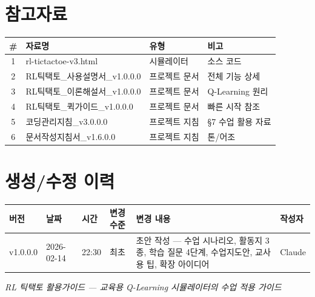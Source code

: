 \documentclass[11pt,a4paper]{article}
\begin{document}
\newpage
\section*{참고자료}

\begin{center}
\renewcommand{\arraystretch}{1.4}
\begin{tabular}{|c|l|l|l|}
\hline
\rowcolor{tableheader}
\textbf{\#} & \textbf{자료명} & \textbf{유형} & \textbf{비고} \\
\hline
1 & rl-tictactoe-v3.html & 시뮬레이터 & 소스 코드 \\
\hline
2 & RL틱택토\_사용설명서\_v1.0.0.0 & 프로젝트 문서 & 전체 기능 상세 \\
\hline
3 & RL틱택토\_이론해설서\_v1.0.0.0 & 프로젝트 문서 & Q-Learning 원리 \\
\hline
4 & RL틱택토\_퀵가이드\_v1.0.0.0 & 프로젝트 문서 & 빠른 시작 참조 \\
\hline
5 & 코딩관리지침\_v3.0.0.0 & 프로젝트 지침 & §7 수업 활용 자료 \\
\hline
6 & 문서작성지침서\_v1.6.0.0 & 프로젝트 지침 & 톤/어조 \\
\hline
\end{tabular}
\end{center}

\section*{생성/수정 이력}

\begin{center}
\renewcommand{\arraystretch}{1.3}
\small
\begin{tabular}{|l|l|l|l|p{5cm}|l|}
\hline
\rowcolor{tableheader}
\textbf{버전} & \textbf{날짜} & \textbf{시간} & \textbf{변경 수준} & \textbf{변경 내용} & \textbf{작성자} \\
\hline
v1.0.0.0 & 2026-02-14 & 22:30 & 최초 & 초안 작성 — 수업 시나리오, 활동지 3종, 학습 질문 4단계, 수업지도안, 교사용 팁, 확장 아이디어 & Claude \\
\hline
\end{tabular}
\end{center}

\vfill
\begin{center}
\small\color{lightbrown}
\emph{RL 틱택토 활용가이드 — 교육용 Q-Learning 시뮬레이터의 수업 적용 가이드}
\end{center}
\end{document}
